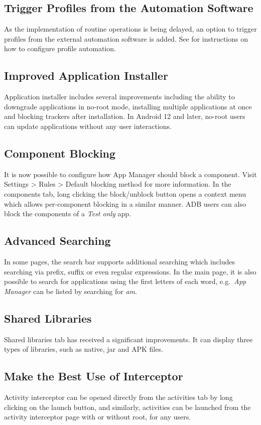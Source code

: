 \subsection{Trigger Profiles from the Automation Software}
As the implementation of routine operations is being delayed, an option to trigger profiles from the external automation software is added.
See  for instructions on how to configure profile automation.

\subsection{Improved Application Installer}
Application installer includes several improvements including the ability to downgrade applications in no-root mode, installing multiple applications at once and blocking trackers after installation.
In Android 12 and later, no-root users can update applications without any user interactions.

\subsection{Component Blocking}
It is now possible to configure how App Manager should block a component. Visit Settings > Rules > Default blocking method for more information.
In the components tab, long clicking the block/unblock button opens a context menu which allows per-component blocking in a similar manner.
ADB users can also block the components of a \textit{Test only} app.

\subsection{Advanced Searching}
In some pages, the search bar supports additional searching which includes searching via prefix, suffix or even regular expressions.
In the main page, it is also possible to search for applications using the first letters of each word, e.g.\ \textit{App Manager} can be listed by searching for \textit{am}.

\subsection{Shared Libraries}
Shared libraries tab has received a significant improvements. It can display three types of libraries, such as native, jar and APK files.

\subsection{Make the Best Use of Interceptor}
Activity interceptor can be opened directly from the activities tab by long clicking on the launch button, and similarly, activities can be launched from the activity interceptor page with or without root, for any users.

